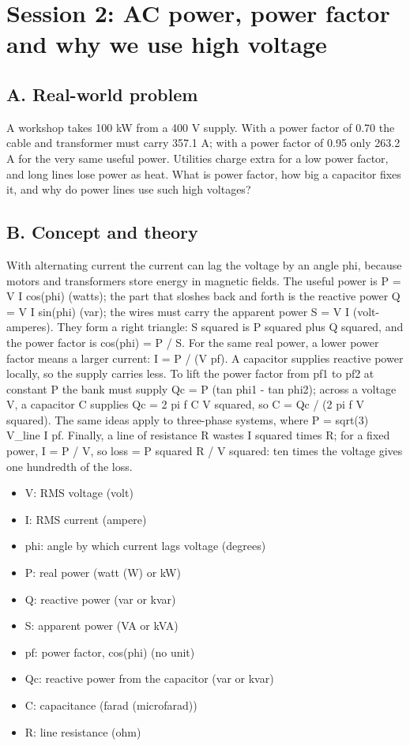 \documentclass[11pt,a4paper]{article}
\begin{document}
\section{Session 2: AC power, power factor and why we use high voltage}

\subsection*{A. Real-world problem}
A workshop takes 100 kW from a 400 V supply. With a power factor of 0.70 the cable and transformer must carry 357.1 A; with a power factor of 0.95 only 263.2 A for the very same useful power. Utilities charge extra for a low power factor, and long lines lose power as heat. What is power factor, how big a capacitor fixes it, and why do power lines use such high voltages?

\subsection*{B. Concept and theory}
With alternating current the current can lag the voltage by an angle phi, because motors and transformers store energy in magnetic fields. The useful power is P = V I cos(phi) (watts); the part that sloshes back and forth is the reactive power Q = V I sin(phi) (var); the wires must carry the apparent power S = V I (volt-amperes). They form a right triangle: S squared is P squared plus Q squared, and the power factor is cos(phi) = P / S. For the same real power, a lower power factor means a larger current: I = P / (V pf). A capacitor supplies reactive power locally, so the supply carries less. To lift the power factor from pf1 to pf2 at constant P the bank must supply Qc = P (tan phi1 - tan phi2); across a voltage V, a capacitor C supplies Qc = 2 pi f C V squared, so C = Qc / (2 pi f V squared). The same ideas apply to three-phase systems, where P = sqrt(3) V\_line I pf. Finally, a line of resistance R wastes I squared times R; for a fixed power, I = P / V, so loss = P squared R / V squared: ten times the voltage gives one hundredth of the loss.

\begin{itemize}[nosep]
\item V: RMS voltage (volt)
\item I: RMS current (ampere)
\item phi: angle by which current lags voltage (degrees)
\item P: real power (watt (W) or kW)
\item Q: reactive power (var or kvar)
\item S: apparent power (VA or kVA)
\item pf: power factor, cos(phi) (no unit)
\item Qc: reactive power from the capacitor (var or kvar)
\item C: capacitance (farad (microfarad))
\item R: line resistance (ohm)
\end{itemize}
\end{document}
